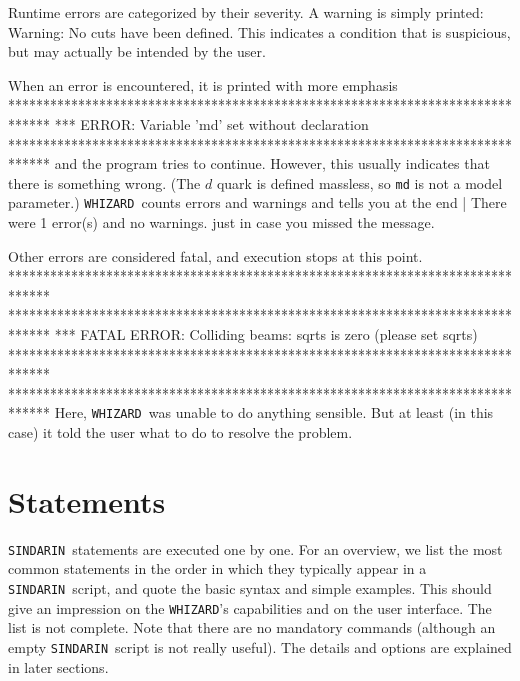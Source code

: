 \documentclass[12pt]{book}
\newenvironment{interaction}%
  {\begingroup\small
   \Verbatim}%
  {\endVerbatim
   \endgroup\noindent}
\newcommand{\ttt}[1]{\texttt{#1}}
\newcommand{\whizard}{\ttt{WHIZARD}}
\newcommand{\sindarin}{\ttt{SINDARIN}}
\begin{document}
Runtime errors are categorized by their severity.  A warning is simply
printed:
\begin{interaction}
Warning: No cuts have been defined.
\end{interaction}
This indicates a condition that is suspicious, but may actually be
intended by the user.

When an error is encountered, it is printed with more emphasis
\begin{interaction}
******************************************************************************
*** ERROR: Variable 'md' set without declaration
******************************************************************************
\end{interaction}
and the program tries to continue.  However, this usually indicates
that there is something wrong.  (The $d$ quark is defined
massless, so \verb|md| is not a model parameter.)  \whizard\ counts
errors and warnings and tells you at the end
\begin{interaction}
| There were  1 error(s) and no warnings.
\end{interaction}
just in case you missed the message.

Other errors are considered fatal, and execution stops at this point.
\begin{interaction}
******************************************************************************
******************************************************************************
*** FATAL ERROR:  Colliding beams: sqrts is zero (please set sqrts)
******************************************************************************
******************************************************************************
\end{interaction}
Here, \whizard\ was unable to do anything sensible. But at least (in
this case) it told the user what to do to resolve the problem.


\section{Statements}
\label{sec:statements}

\sindarin\ statements are executed one by one.  For an overview, we
list the most common statements in the order in which they typically
appear in a \sindarin\ script, and quote the basic syntax and simple
examples.  This should give an impression on the \whizard's
capabilities and on the user interface.  The list is not complete.
Note that there are no
mandatory commands (although an empty \sindarin\ script is not really
useful).  The details and options are explained in later sections.
\end{document}
